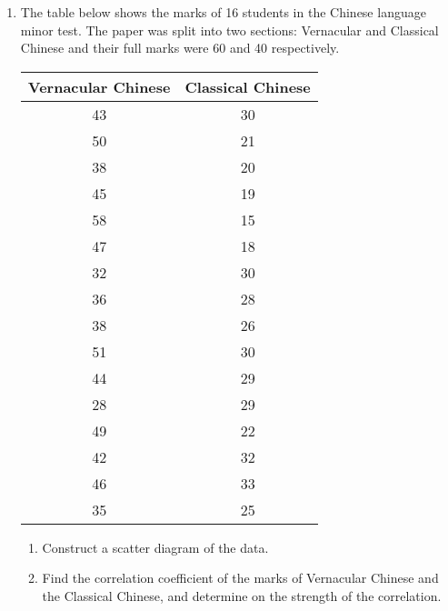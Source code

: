 \documentclass{report}
\begin{document}
\begin{multicols}{2}
\begin{enumerate}
    \item The table below shows the marks of 16 students in the Chinese language minor
          test. The paper was split into two sections: Vernacular and Classical Chinese
          and their full marks were 60 and 40 respectively.
          \begin{center}
            \begin{tabular}{|c|c|}
              \hline
              Vernacular Chinese & Classical Chinese \\
              \hline
              43                 & 30                \\
              50                 & 21                \\
              38                 & 20                \\
              45                 & 19                \\
              58                 & 15                \\
              47                 & 18                \\
              32                 & 30                \\
              36                 & 28                \\
              38                 & 26                \\
              51                 & 30                \\
              44                 & 29                \\
              28                 & 29                \\
              49                 & 22                \\
              42                 & 32                \\
              46                 & 33                \\
              35                 & 25                \\
              \hline
            \end{tabular}
          \end{center}
          \begin{enumerate}
            \item Construct a scatter diagram of the data.
            \item Find the correlation coefficient of the marks of Vernacular Chinese and the
                  Classical Chinese, and determine on the strength of the correlation.
          \end{enumerate}


\end{enumerate}
\end{multicols}
\end{document}
